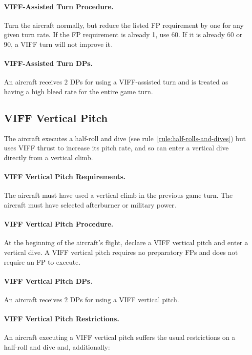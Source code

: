 \begin{advancedrules}
{\paragraph{VIFF-Assisted Turn Procedure.} Turn the aircraft normally, but reduce the listed FP requirement by one for any given turn rate. If the FP requirement is already 1, use 60{\deg}. If it is already 60{\deg} or 90{\deg}, a VIFF turn will not improve it.

\paragraph{VIFF-Assisted Turn DPs.} An aircraft receives 2 DPs for using a VIFF-assisted turn and is treated as having a high bleed rate for the entire game turn.

\subsection{VIFF Vertical Pitch}
\label{rule:viff-vertical-pitch}

The aircraft executes a half-roll and dive (see rule~\ref{rule:half-rolls-and-dives}) but uses VIFF thrust to increase its pitch rate, and so can enter a vertical dive directly from a vertical climb.

\paragraph{VIFF Vertical Pitch Requirements.} The aircraft must have used a vertical climb in the previous game turn. The aircraft must have selected afterburner or military power.

\paragraph{VIFF Vertical Pitch Procedure.} At the beginning of the aircraft's flight, declare a VIFF vertical pitch and enter a vertical dive. A VIFF vertical pitch requires no preparatory FPs and does not require an FP to execute.

\paragraph{VIFF Vertical Pitch DPs.} An aircraft receives 2 DPs for using a VIFF vertical pitch.

\paragraph{VIFF Vertical Pitch Restrictions.} An aircraft executing a VIFF vertical pitch suffers the usual restrictions on a half-roll and dive and, additionally:

}
\end{advancedrules}
